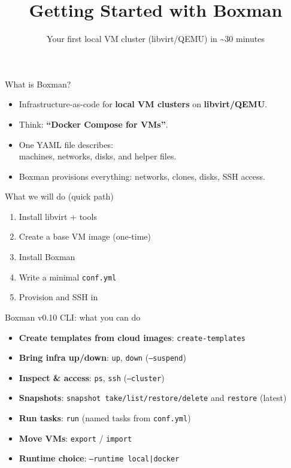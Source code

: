 \documentclass[aspectratio=169]{beamer}
\title{Getting Started with Boxman}
\subtitle{Your first local VM cluster (libvirt/QEMU) in \textasciitilde 30 minutes}
\author{}
\date{}
\begin{document}
\begin{frame}[fragile]
  \titlepage
\end{frame}

\begin{frame}[fragile]{What is Boxman?}
\begin{itemize}
  \item Infrastructure-as-code for \textbf{local VM clusters} on \textbf{libvirt/QEMU}.
  \item Think: \textbf{``Docker Compose for VMs''}.
  \item One YAML file describes:\\
    \hspace*{1em}machines, networks, disks, and helper files.
  \item Boxman provisions everything: networks, clones, disks, SSH access.
\end{itemize}
\end{frame}

\begin{frame}[fragile]{What we will do (quick path)}
\begin{enumerate}
  \item Install libvirt + tools
  \item Create a base VM image (one-time)
  \item Install Boxman
  \item Write a minimal \texttt{conf.yml}
  \item Provision and SSH in
\end{enumerate}
\end{frame}

\begin{frame}[fragile]{Boxman v0.10 CLI: what you can do}
\begin{itemize}
  \item \textbf{Create templates from cloud images}: \texttt{create-templates}
  \item \textbf{Bring infra up/down}: \texttt{up}, \texttt{down} (\texttt{--suspend})
  \item \textbf{Inspect \& access}: \texttt{ps}, \texttt{ssh} (\texttt{--cluster})
  \item \textbf{Snapshots}: \texttt{snapshot take/list/restore/delete} and \texttt{restore} (latest)
  \item \textbf{Run tasks}: \texttt{run} (named tasks from \texttt{conf.yml})
  \item \textbf{Move VMs}: \texttt{export} / \texttt{import}
  \item \textbf{Runtime choice}: \texttt{--runtime local|docker}
\end{itemize}
\end{frame}
\end{document}
